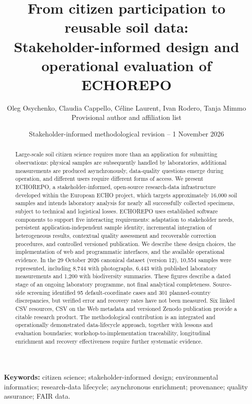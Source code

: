 \documentclass[11pt,a4paper]{article}
\title{From citizen participation to reusable soil data:\\
Stakeholder-informed design and operational evaluation of ECHOREPO}
\author{Oleg Osychenko, Claudia Cappello, C\'eline Laurent, Ivan Rodero, Tanja Mimmo\\[2pt]
\small Provisional author and affiliation list}
\date{Stakeholder-informed methodological revision -- 1 November 2026}
\newcommand{\repo}{\textsc{ECHOREPO}}
\begin{document}
\maketitle

\begin{abstract}
Large-scale soil citizen science requires more than an application for submitting observations: physical samples are subsequently handled by laboratories, additional measurements are produced asynchronously, data-quality questions emerge during operation, and different users require different forms of access. We present \repo, a stakeholder-informed, open-source research-data infrastructure developed within the European ECHO project, which targets approximately 16,000 soil samples and intends laboratory analysis for nearly all successfully collected specimens, subject to technical and logistical losses. ECHOREPO uses established software components to support five interacting requirements: adaptation to stakeholder needs, persistent application-independent sample identity, incremental integration of heterogeneous results, contextual quality assessment and recoverable correction procedures, and controlled versioned publication. We describe these design choices, the implementation of web and programmatic interfaces, and the available operational evidence. In the 29 October 2026 canonical dataset (version 12), 10,554 samples were represented, including 8,744 with photographs, 6,443 with published laboratory measurements and 1,200 with biodiversity summaries. These figures describe a dated stage of an ongoing laboratory programme, not final analytical completeness. Source-side screening identified 95 default-coordinate cases and 301 planned-country discrepancies, but verified error and recovery rates have not been measured. Six linked CSV resources, CSV on the Web metadata and versioned Zenodo publication provide a citable research product. The methodological contribution is an integrated and operationally demonstrated data-lifecycle approach, together with lessons and evaluation boundaries; workshop-to-implementation traceability, longitudinal enrichment and recovery effectiveness require further systematic evidence.
\end{abstract}

\noindent\textbf{Keywords:} citizen science; stakeholder-informed design; environmental informatics; research-data lifecycle; asynchronous enrichment; provenance; quality assurance; FAIR data.
\end{document}
